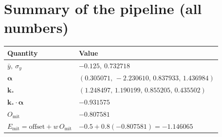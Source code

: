\documentclass[11pt]{article}
\begin{document}
\section*{Summary of the pipeline (all numbers)}
\begin{center}
\renewcommand{\arraystretch}{1.3}
\begin{tabular}{@{}ll@{}}
\toprule
Quantity & Value \\
\midrule
$\bar y,\ \sigma_y$ & $-0.125,\ 0.732718$ \\
$\bm\alpha$ & $(0.305071,\,-2.230610,\,0.837933,\,1.436984)$ \\
$\bm k_*$ & $(1.248497,\,1.190199,\,0.855205,\,0.435502)$ \\
$\bm k_*\!\cdot\bm\alpha$ & $-0.931575$ \\
$O_{\mathrm{mit}}$ & $-0.807581$ \\
$E_{\mathrm{mit}}=\text{offset}+w\,O_{\mathrm{mit}}$ & $-0.5+0.8(-0.807581)=\mathbf{-1.146065}$ \\
\bottomrule
\end{tabular}
\end{center}
\end{document}
